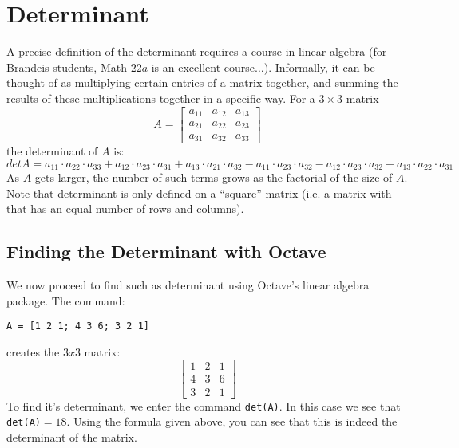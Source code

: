 \documentclass{article}
\begin{document}
\section{Determinant}
A precise definition of the determinant requires a course in linear algebra (for Brandeis students, Math $22a$ is an excellent course$\ldots$).  Informally, it can be thought of as multiplying certain entries of a matrix together, and summing the results of these multiplications together in a specific way.  For a $3 \times 3$ matrix
\[A =
\left[
\begin{array}{ccc}
a_{11} & a_{12} & a_{13} \\
a_{21} & a_{22} & a_{23} \\ 
a_{31} & a_{32} & a_{33} 
 \end{array}
 \right]
\]
the determinant of $A$ is:
\[ det A = a_{11} \cdot a_{22} \cdot a_{33} + a_{12} \cdot a_{23} \cdot a_{31} + a_{13} \cdot a_{21} \cdot a_{32}  - a_{11} \cdot a_{23} \cdot a_{32} - a_{12} \cdot a_{23} \cdot a_{32} - a_{13} \cdot a_{22} \cdot a_{31}\]
As $A$ gets larger, the number of such terms grows as the factorial of the size of $A$.
Note that determinant is only defined on a ``square'' matrix (i.e. a matrix with that has an equal number of rows and columns).
\subsection{Finding the Determinant with Octave}
We now proceed to find such as determinant using Octave's linear algebra package.  The command:
\begin{verbatim}
A = [1 2 1; 4 3 6; 3 2 1]
\end{verbatim}
creates the $3x3$ matrix:
\[
\left[
\begin{array}{ccc}
1 & 2 & 1 \\
4 & 3 & 6 \\
3 & 2 & 1
 \end{array}
 \right]
\]
To find it's determinant, we enter the command \verb|det(A)|.  In this case we see that \verb|det(A)|$ = 18$.  Using the formula given above, you can see that this is indeed the determinant of the matrix. 
\end{document}
